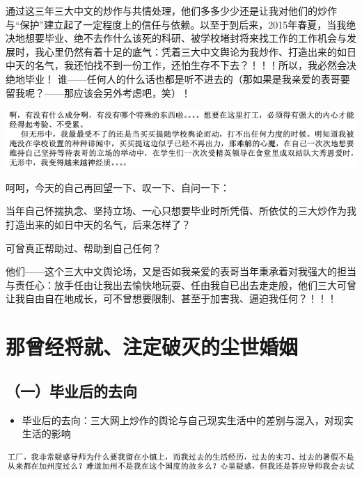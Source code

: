 \documentclass[9pt, b5paper]{article}
\begin{document}
通过这三年三大中文的炒作与共情处理，他们多多少少还是让我对他们的炒作与“保护”建立起了一定程度上的信任与依赖。以至于到后来，2015年春夏，当我绝决地想要毕业、绝不去作什么该死的科研、被学校堵封将来找工作的工作机会与发展时，我心里仍然有着十足的底气：凭着三大中文舆论为我炒作、打造出来的如日中天的名气，我还怕找不到一份工作，还怕生存不下去？！！！所以，我必然会决绝地毕业！ 谁——任何人的什么话也都是听不进去的（那如果是我亲爱的表哥要留我呢？——那应该会另外考虑吧，笑）！

\begin{center}
\includegraphics[width=.9\linewidth]{./pic/backups_plans_20210424_130121.png}
\end{center}

呵呵，今天的自己再回望一下、叹一下、自问一下：

当年自己怀揣执念、坚持立场、一心只想要毕业时所凭借、所依仗的三大炒作为我打造出来的如日中天的名气，后来怎样了？

可曾真正帮助过、帮助到自己任何？

他们——这个三大中文舆论场，又是否如我亲爱的表哥当年秉承着对我强大的担当与责任心：放手任由让我出去愉快地玩耍、任由我自已出去走走般，他们三大可曾让我自由自在地成长，可不曾想要限制、甚至于加害我、逼迫我任何？！！！


\section{那曾经将就、注定破灭的尘世婚姻}
\label{sec:orgd7b949f}

\subsection{（一）毕业后的去向}
\label{sec:org2a6ec5f}

\begin{itemize}
\item 毕业后的去向：三大网上炒作的舆论与自己现实生活中的差别与混入，对现实生活的影响
\end{itemize}

\begin{center}
\includegraphics[width=.9\linewidth]{./pic/backups_plans_20210426_095826.png}
\end{center}
\end{document}
